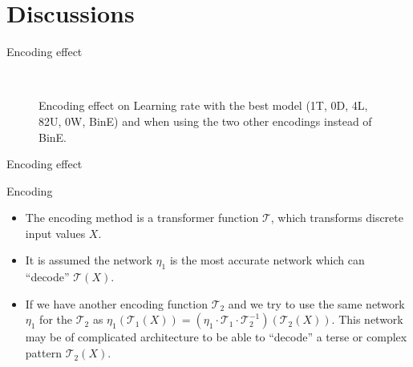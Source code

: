 \section{Discussions}


\begin{frame}[fragile]{Encoding effect}
	\begin{figure}[!t]
		  \begin{tikzpicture}
		
		  \end{tikzpicture}
		\caption{Encoding effect on Learning rate with the best model (1T, 0D, 4L, 82U, 0W, BinE) and when using the two other encodings	instead of BinE.}~\label{Fig:ArabicModelsResults}

	\end{figure}

\end{frame}



\begin{frame}[fragile]{Encoding effect}

\begin{block}{Encoding}
	\begin{itemize}
		
		\item The encoding method is a transformer function $\mathcal{T}$, which transforms discrete input values $X$. 
		\item It is assumed the network $\eta_1$ is the most accurate network which can ``decode'' $\mathcal{T}(X)$. 
		\item If we have another encoding function $\mathcal{T}_2$ and we try to use the same network $\eta_1$ for the $\mathcal{T}_2$ as $\eta_1\left(\mathcal{T}_1(X)\right) = \left(\eta_1\cdot\mathcal{T}_1\cdot \mathcal{T}_2^{-1} \right)\left(\mathcal{T}_2(X)\right)$. This network may be of complicated architecture to be able to “decode” a terse or complex pattern $\mathcal{T}_2(X)$.
		
	\end{itemize}
	
\end{block}

\end{frame}

